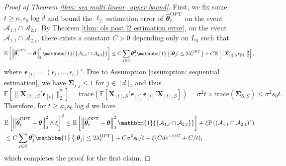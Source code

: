 \documentclass[aos,preprint]{imsart}
\theoremstyle{plain}
\theoremstyle{definition}
\newcommand{\btheta}{\boldsymbol{\theta}}
\newcommand{\bd}[1]{\boldsymbol{#1}}
\newcommand{\idf}{\mathbbm{1}}
\newcommand{\bX}{\boldsymbol{X}}
\newcommand{\bSigma}{\boldsymbol{\Sigma}}
\newcommand{\ptheta}{\widehat{\boldsymbol{\theta}}^{\textup{OPT}}}
\newcommand{\hdlambda}{\lambda^{\textup{OPT}}}
\newcommand{\bepsilon}{\bd{\epsilon}}
\newcommand{\cA}{\mathcal{A}}
\newcommand{\Exp}{\mathbb{E}}
\newcommand{\Pro}{\mathbb{P}}
\begin{document}
\begin{appendix}
\begin{proof}[Proof of Theorem \ref{thm: seq multi linear, upper bound}]
First, we fix some $t\ge \kappa_1 s_0\log d$ and bound the $\ell_2$ estimation error of $\ptheta_t$ on the event $\mathcal{A}_{1,t}\cap\mathcal{A}_{2,t}$. By Theorem \ref{thm: ols post l2 estimation error}, on the event $\mathcal{A}_{1,t}\cap\mathcal{A}_{2,t}$, there exists a constant $C>0$ depending only on $L_0$ such that 
\begin{equation*}
\Exp\left[\left\|\ptheta_t-\btheta \right\|_2^2\idf{\{\cA_{1,t}\cap \cA_{2,t}\}}\right] \le C\sum_{j\in S} \btheta_j^2 \idf\left\{|\btheta_j| \le 2\hdlambda_t  \right\} + C\Exp\left[\|\bX_{[t],S}'\bepsilon_{[t]}\|_2^2\right],
\end{equation*} 
where $\bepsilon_{[t]} = (\epsilon_1,\ldots,\epsilon_t)'$. 
Due to Assumption \ref{assumption: sequential estimation},  we have $\bSigma_{j,j} \leq 1$ for $j \in [d]$, and thus 
$$\Exp\left[\|\bX_{[t],S}'\bepsilon_{[t]}\|_2^2\right] = \text{trace}(\Exp[\bX_{[t],S}'\bepsilon_{[t]}\bepsilon_{[t]}'\bX_{[t],S}]) = \sigma^2 t \times \text{trace}(\bSigma_{S,S}) \leq \sigma^2 s_0 t.$$
Therefore, for $t\ge \kappa_1 s_0\log d$ we have
\begin{equation*} 
\begin{aligned}
&\Exp\left[\left\|\ptheta_t-\btheta \right\|_2^2 \wedge \xi \right]^2 \le \Exp\left[\left\|\ptheta_t-\btheta \right\|_2^2 \idf{\{\mathcal{A}_{1,t} \cap \mathcal{A}_{2,t}\}} \right] + \xi \Pro\left((\mathcal{A}_{1,t} \cap \mathcal{A}_{2,t})^c\right)
\\&\le C \sum_{j\in S} \btheta_j^2 \idf\left\{|\btheta_j| \le 2\hdlambda_t  \right\} + C\sigma^2 s_0/t + \xi (Cde^{-t/C} + C/t),
\end{aligned}
\end{equation*}
which completes the proof for the first claim.


\end{proof}
\end{appendix}
\end{document}
